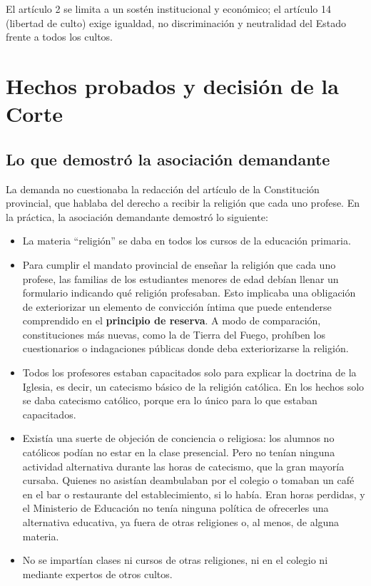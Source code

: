 \documentclass[12pt,oneside]{book}
\begin{document}
\begin{important}
El artículo 2 se limita a un sostén institucional y económico; el artículo 14 (libertad de culto) exige igualdad, no discriminación y neutralidad del Estado frente a todos los cultos.
\end{important}

\section{Hechos probados y decisión de la Corte}

\subsection{Lo que demostró la asociación demandante}

La demanda no cuestionaba la redacción del artículo de la Constitución provincial, que hablaba del derecho a recibir la religión que cada uno profese. En la práctica, la asociación demandante demostró lo siguiente:

\begin{itemize}
    \item La materia ``religión'' se daba en todos los cursos de la educación primaria.
    \item Para cumplir el mandato provincial de enseñar la religión que cada uno profese, las familias de los estudiantes menores de edad debían llenar un formulario indicando qué religión profesaban. Esto implicaba una obligación de exteriorizar un elemento de convicción íntima que puede entenderse comprendido en el \textbf{principio de reserva}. A modo de comparación, constituciones más nuevas, como la de Tierra del Fuego, prohíben los cuestionarios o indagaciones públicas donde deba exteriorizarse la religión.
    \item Todos los profesores estaban capacitados solo para explicar la doctrina de la Iglesia, es decir, un catecismo básico de la religión católica. En los hechos solo se daba catecismo católico, porque era lo único para lo que estaban capacitados.
    \item Existía una suerte de objeción de conciencia o religiosa: los alumnos no católicos podían no estar en la clase presencial. Pero no tenían ninguna actividad alternativa durante las horas de catecismo, que la gran mayoría cursaba. Quienes no asistían deambulaban por el colegio o tomaban un café en el bar o restaurante del establecimiento, si lo había. Eran horas perdidas, y el Ministerio de Educación no tenía ninguna política de ofrecerles una alternativa educativa, ya fuera de otras religiones o, al menos, de alguna materia.
    \item No se impartían clases ni cursos de otras religiones, ni en el colegio ni mediante expertos de otros cultos.
\end{itemize}
\end{document}
